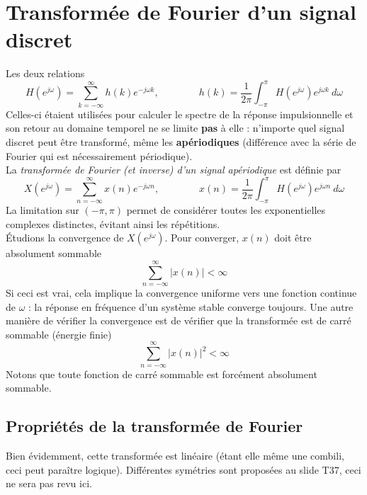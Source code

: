 \section{Transformée de Fourier d'un signal discret}
Les deux relations
\begin{equation}
H(e^{j\omega}) = \sum_{k=-\infty}^\infty h(k)e^{-j\omega k},\qquad\qquad h(k) = \dfrac{1}{2\pi}
\int_{-\pi}^\pi H(e^{j\omega}) e^{j\omega k}\ d\omega
\end{equation}
Celles-ci étaient utilisées pour calculer le spectre de la réponse impulsionnelle et son 
retour au domaine temporel ne se limite \textbf{pas} à elle : n'importe quel signal discret 
peut être transformé, même les \textbf{apériodiques} (différence avec la série de Fourier qui 
est nécessairement périodique).\\
La \textit{transformée de Fourier (et inverse) d'un signal apériodique} est définie par
\begin{equation}
X(e^{j\omega}) = \sum_{n=-\infty}^\infty x(n)e^{-j\omega n},\qquad\qquad x(n) = \dfrac{1}{2\pi}
\int_{-\pi}^\pi H(e^{j\omega}) e^{j\omega n}\ d\omega
\end{equation}
La limitation sur $(-\pi,\pi)$ permet de considérer toutes les exponentielles complexes 
distinctes, évitant ainsi les répétitions. \\
Étudions la convergence de $X(e^{j\omega})$. Pour converger, $x(n)$ doit être absolument sommable
\begin{equation}
\sum_{n=-\infty}^\infty |x(n)|<\infty
\end{equation}
Si ceci est vrai, cela implique la convergence uniforme vers une fonction continue de $\omega$ : 
la réponse en fréquence d'un système stable converge toujours.  Une autre manière de vérifier la 
convergence est de vérifier que la transformée est de carré sommable (énergie finie)
\begin{equation}
\sum_{n=-\infty}^\infty |x(n)|^2<\infty
\end{equation}
Notons que toute fonction de carré sommable est forcément absolument sommable.

	\subsection{Propriétés de la transformée de Fourier}
	Bien évidemment, cette transformée est linéaire (étant elle même une combili, ceci peut 
	paraître logique). Différentes symétries sont proposées au slide T37, ceci ne sera pas 
	revu ici.
	
